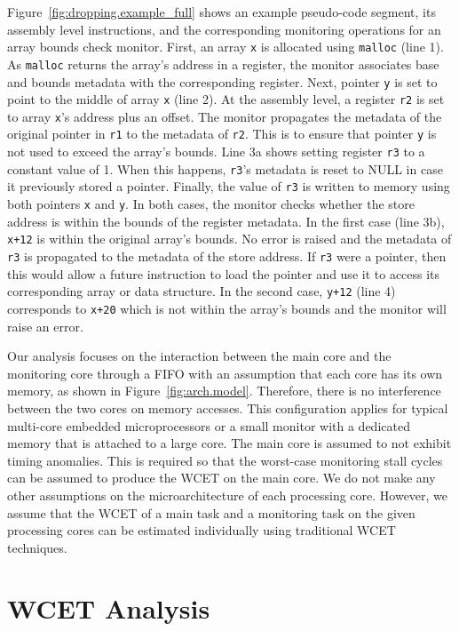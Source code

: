 Figure~\ref{fig:dropping.example_full} shows an example pseudo-code segment,
its assembly level instructions, and the corresponding monitoring operations
for an array bounds check monitor. 
First, an array {\tt x} is allocated using {\tt malloc} (line 1). 
As {\tt malloc} returns the array's address in a register, the monitor
associates base and bounds metadata with the corresponding register. 
Next, pointer {\tt y} is set to point to the middle of array {\tt x} (line 2). 
At the assembly level, a register {\tt r2} is set to array {\tt x}'s address plus an offset.
The monitor propagates the metadata of the original pointer in {\tt r1} to the
metadata of {\tt r2}. This is to ensure that pointer {\tt y} is not used to exceed the array's bounds.
Line 3a shows setting register {\tt r3} to a constant value of 1.
When this happens,
{\tt r3}'s metadata is reset to NULL in case it previously stored a
pointer. 
Finally, the value of {\tt r3} is written to memory using both pointers {\tt x} and {\tt y}.
In both cases, the monitor checks whether the store address is within the bounds of the register metadata. In the first case (line 3b), {\tt x+12}
is within the original array's bounds. No error is raised and the metadata of
{\tt r3} is propagated to the metadata of the store address. If {\tt r3} were a
pointer, then this would allow a future instruction to load the pointer and use
it to access its corresponding array or data structure. In the second case,
{\tt y+12} (line 4) corresponds to {\tt x+20} which is not within the array's bounds and
the monitor will raise an error. 

Our analysis focuses on the interaction between the main core and
the monitoring core through a FIFO with an assumption that each core has its own
memory, as shown in Figure~\ref{fig:arch.model}. Therefore, there is no interference
between the two cores on memory accesses. This configuration applies for typical
multi-core embedded microprocessors or a small monitor with a dedicated memory that
is attached to a large core. The main core is assumed to not exhibit timing
anomalies. This is required so that the worst-case monitoring stall cycles can
be assumed to produce the WCET on the main core. 
We do not make any other assumptions on the microarchitecture of each processing
core. However, we assume that the WCET of a main task and a monitoring task on
the given processing cores can be estimated individually using traditional WCET
techniques.

\section{WCET Analysis}


